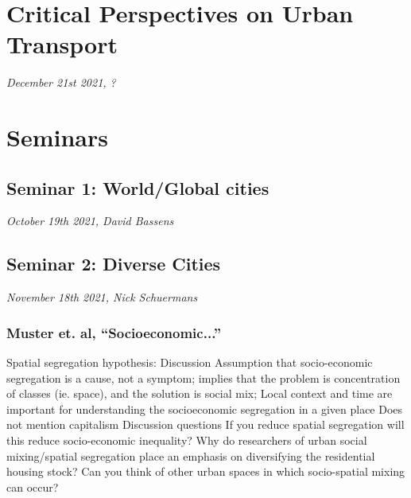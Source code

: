 \documentclass{article}
\begin{document}

\section{Critical Perspectives on Urban Transport}
\textit{December 21st 2021, ?}


\section{Seminars}

\subsection{Seminar 1: World/Global cities}
\textit{October 19th 2021, David Bassens}


\subsection{Seminar 2: Diverse Cities}
\textit{November 18th 2021, Nick Schuermans}

\subsubsection{Muster et. al, ``Socioeconomic...''}
\begin{outline}
	\1 Spatial segregation hypothesis:
		\2 
	\1 Discussion
		\2 Assumption that socio-economic segregation is a cause, not a symptom; implies that the problem is concentration of classes (ie. space), and the solution is social mix; 
		\2 Local context and time are important for understanding the socioeconomic segregation in a given place
		\2 Does not mention capitalism
	\1 Discussion questions
		\2 If you reduce spatial segregation will this reduce socio-economic inequality?
		\2 Why do researchers of urban social mixing/spatial segregation place an emphasis on diversifying the residential housing stock? Can you think of other urban spaces in which socio-spatial mixing can occur?
\end{outline}
\end{document}
